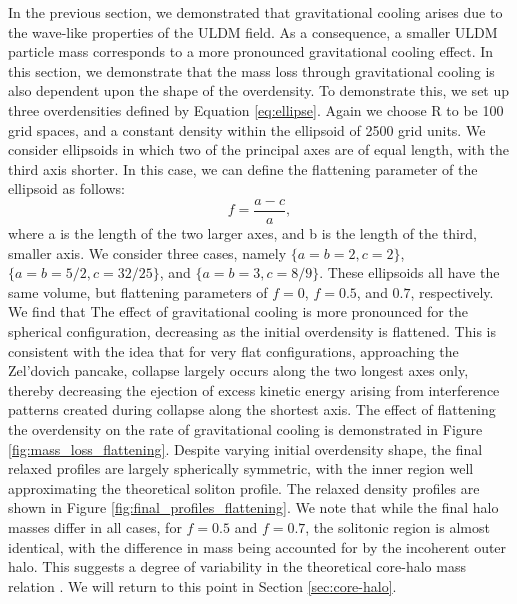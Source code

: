 \documentclass[a4paper,11pt]{article}
\begin{document}
In the previous section, we demonstrated that gravitational cooling arises due to the wave-like properties of the ULDM field. As a consequence, a smaller ULDM particle mass corresponds to a more pronounced gravitational cooling effect. In this section, we demonstrate that the mass loss through gravitational cooling is also dependent upon the shape of the overdensity. To demonstrate this, we set up three overdensities defined by Equation \ref{eq:ellipse}. Again we choose R to be 100 grid spaces, and a constant density within the ellipsoid of 2500 grid units. We consider ellipsoids in which two of the principal axes are of equal length, with the third axis shorter. In this case, we can define the flattening parameter of the ellipsoid as follows:
\begin{equation}
    f = \frac{a-c}{a},
\end{equation}
where a is the length of the two larger axes, and b is the length of the third, smaller axis. We consider three cases, namely $\{a = b = 2, c = 2\}$, $\{a = b = 5/2, c = 32/25\}$, and $\{a = b = 3, c = 8/9\}$. These ellipsoids all have the same volume, but flattening parameters of $f = 0$, $f = 0.5$, and $0.7$, respectively. We find that The effect of gravitational cooling is more pronounced for the spherical configuration, decreasing as the initial overdensity is flattened. This is consistent with the idea that for very flat configurations, approaching the Zel'dovich pancake, collapse largely occurs along the two longest axes only, thereby decreasing the ejection of excess kinetic energy arising from interference patterns created during collapse along the shortest axis. The effect of flattening the overdensity on the rate of gravitational cooling is demonstrated in Figure \ref{fig:mass_loss_flattening}. Despite varying initial overdensity shape, the final relaxed profiles are largely spherically symmetric, with the inner region well approximating the theoretical soliton profile. The relaxed density profiles are shown in Figure \ref{fig:final_profiles_flattening}. We note that while the final halo masses differ in all cases, for $f = 0.5$ and $f = 0.7$, the solitonic region is almost identical, with the difference in mass being accounted for by the incoherent outer halo. This suggests a degree of variability in the theoretical core-halo mass relation \cite{Schive:2014dra, Bar:2018acw}. We will return to this point in Section \ref{sec:core-halo}. 
\end{document}

